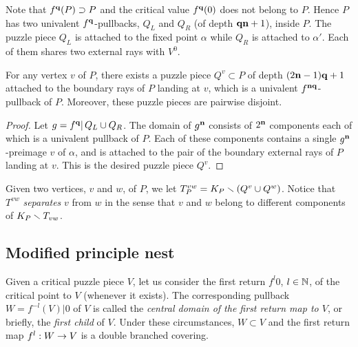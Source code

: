 \medskip
Note that $f^{\mathbf{q}}(P)\supset P$ and  the critical value  $f^{\mathbf{q}}(0)$
does not belong to $P$. Hence $P$ has two univalent $f^{\mathbf{q}}$-pullbacks,
$Q_L$ and $Q_R$ (of depth ${\mathbf{q}} {\mathbf{n}}+1$),  inside $P$.
The puzzle piece $Q_L$ is attached to the fixed point $\alpha$
 while $Q_R$ is attached to $\alpha'$. Each of them shares two external rays with $V^0$.


\begin{lem}\label{separating family}
For any  vertex $v$ of $P$,
there exists a puzzle piece $Q^v\subset P$ of depth $(2{\mathbf{n}}-1){\mathbf{q}}+1$
attached to the boundary rays of $P$ landing at $v$,
 which is a univalent $f^{{\mathbf{n}}{\mathbf{q}}}$-pullback of $P$.
Moreover, these puzzle pieces are pairwise disjoint.
\end{lem}

\begin{proof}
Let $g= f^{\mathbf{q}} |\, Q_L\cup Q_R$.
The domain of $g^{\mathbf{n}}$ consists of $2^{\mathbf{n}}$ components each of which is a univalent pullback of $P$.
Each of these components contains a single $g^{\mathbf{n}}$-preimage $v$ of $\alpha$,
and is attached to the pair of the boundary external rays of $P$ landing at $v$.
This is the desired puzzle piece $Q^v$.
\end{proof}


Given two vertices, $v$ and $w$, of $P$,
we let $T^{vw}_P= K_P\smallsetminus (Q^v\cup Q^w)$.
Notice that $T^{vw}$ {\it separates} $v$ from $w$ in the sense that $v$ and $w$ belong to different components
of $K_P\smallsetminus T_{vw}$.

\subsection{Modified principle nest}
  Given a critical puzzle piece $V$, %
let us consider the first return $f^l 0$, $l\in {\Bbb N}$,  of the critical point to $V$
(whenever it exists).
The corresponding pullback $W= f^{-l}(V)|0$ of $V$ is called
the {\it central domain of the first return map to $V$},
or briefly, the {\it first child} of $V$.
Under these circumstances, $W\subset V$ and the first return map $f^l: W\rightarrow V$ is a double branched covering.

